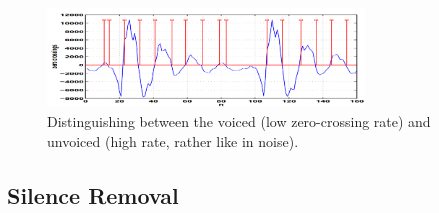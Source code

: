 \documentclass[12pt, a4paper, twoside]{report}
\begin{document}
\begin{figure}[!h]
	\centering
	\includegraphics[width=0.75\textwidth]
	{images/chapter2/low-high-zcr}
	\caption{Distinguishing between the voiced (low zero-crossing rate) and unvoiced (high rate, rather like in noise).}
	\label{fig:low-high-zcr}
\end{figure}

\subsection{Silence Removal}
\end{document}
